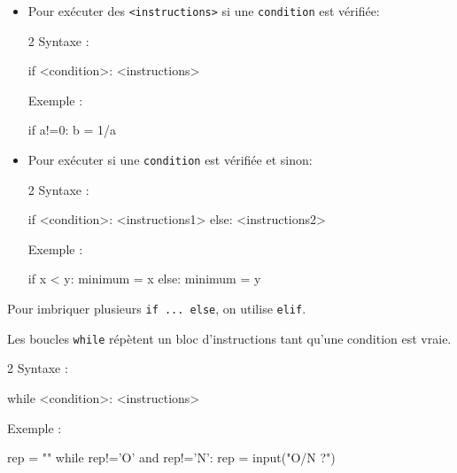\documentclass[11pt,a4paper]{article}
\begin{document}
\begin{tcolorbox}[left=0cm,title=\bf{\faPython \; Instructions conditionnelles},colbacktitle=cfond]
	\begin{itemize}
		\item[\textbullet] Pour exécuter des {\tt <instructions>} si une {\tt condition} est vérifiée:
	\setlength{\multicolsep}{0pt}
	\begin{multicols}{2}
	Syntaxe :
	\begin{python} 
if <condition>:
	<instructions>
	\end{python} 
	Exemple : 
	\begin{python} 
if a!=0:
	b = 1/a
	\end{python} 
\end{multicols}
\item[\textbullet] Pour exécuter {\tt <instructions1>} si une {\tt condition} est vérifiée et {\tt <instructions2>} sinon:
\begin{multicols}{2}
	Syntaxe :
	\begin{python} 
if <condition>:
	<instructions1>
else:
	<instructions2>
	\end{python} 
	Exemple : 
	\begin{python} 
if x < y:
	minimum = x
else:
	minimum = y
	\end{python} 
\end{multicols}
\end{itemize}
Pour imbriquer plusieurs {\tt if ... else}, on utilise {\tt elif}.
\end{tcolorbox}

\begin{tcolorbox}[left=0cm,title=\bf{\faPython \; Boucles {\tt while}},colbacktitle=cfond]
	Les boucles {\tt while} répètent un bloc d'instructions tant qu'une condition est vraie.
	\setlength{\multicolsep}{0pt}
	\begin{multicols}{2}
		Syntaxe :
		\begin{python} 
while <condition>:
	<instructions>
		\end{python} 
		Exemple : 
		\begin{python}
rep = "" 
while rep!='O' and rep!='N':
	rep = input("O/N ?")
		\end{python}
	\end{multicols}
\end{tcolorbox}
\end{document}
